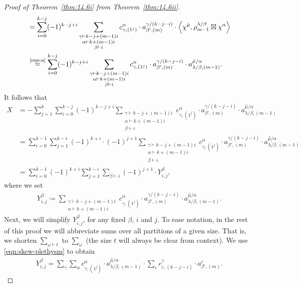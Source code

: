 \documentclass[ALCO, Unicode]{cedram}
\begin{document}
\begin{proof}[Proof of Theorem~\ref{thm:14.6i} from Theorem~\ref{thm:14.6ii}]
\begin{align*}
		&=\sum_{i=0}^{k-j}(-1)^{k-j+i}\sum_{\substack{\gamma\vdash k-j + (m-1)i\\ \alpha\vdash k+(m-1)i\\ \beta\vdash i}} c^{\alpha}_{\gamma,(1^j)}\cdot a^{\gamma/(k-j-i)}_{\beta',(m)}\cdot \left\langle\chi^{\hat{\mu}},\rho^{\lambda/\beta}_{m-1}\boxtimes\chi^\alpha\right\rangle\\
		&\overset{\normalfont\tiny\text{\eqref{eqn:a}}}{=}\sum_{i=0}^{k-j}(-1)^{k-j+i}\sum_{\substack{\gamma\vdash k-j + (m-1)i\\ \alpha\vdash k+(m-1)i\\ \beta\vdash i}} c^{\alpha}_{\gamma,(1^j)}\cdot a^{\gamma/(k-j-i)}_{\beta',(m)}\cdot a^{\hat{\mu}/\alpha}_{\lambda/\beta,(m-1)}.
	\end{align*}
	It follows that
	\begin{align*}
		X &= -\sum_{j=1}^k \sum_{i=0}^{k-j}(-1)^{k-j+i}\sum_{\substack{\gamma\vdash k-j + (m-1)i\\ \alpha\vdash k+(m-1)i\\ \beta\vdash i}} c^{\alpha}_{\gamma,(1^j)}\cdot a^{\gamma/(k-j-i)}_{\beta',(m)}\cdot a^{\hat{\mu}/\alpha}_{\lambda/\beta,(m-1)}\\
		&= \sum_{i=0}^{k-1} \sum_{j=1}^{k-i} (-1)^{k+i} \cdot (-1)^{j+1} \sum_{\substack{\gamma\vdash k-j + (m-1)i\\ \alpha\vdash k+(m-1)i\\ \beta\vdash i}} c^{\alpha}_{\gamma,(1^j)}\cdot a^{\gamma/(k-j-i)}_{\beta',(m)}\cdot a^{\hat{\mu}/\alpha}_{\lambda/\beta,(m-1)}\\
		&= \sum_{i=0}^{k-1} (-1)^{k+i} \sum_{j=1}^{k-i} \sum_{\beta\vdash i} (-1)^{j+1}\cdot Y^\beta_{i,j},
	\end{align*}
	where we set
	\begin{align*}
		Y^\beta_{i,j}\coloneqq \sum_{\substack{\gamma\vdash k-j + (m-1)i\\ \alpha\vdash k+(m-1)i}} c^{\alpha}_{\gamma,(1^j)}\cdot a^{\gamma/(k-j-i)}_{\beta',(m)}\cdot a^{\hat{\mu}/\alpha}_{\lambda/\beta,(m-1)}.
	\end{align*}
	Next, we will simplify $Y^\beta_{i,j}$, for any fixed $\beta$, $i$ and $j$. To ease notation, in the rest of this proof we will abbreviate sums over all partitions of a given size. That is, we shorten $\sum_{\omega\vdash t}$ to $\sum_\omega$ (the size $t$ will always be clear from context). We use \eqref{eqn:skew-plethysm} to obtain
	\begin{align*}
		Y^\beta_{i,j}=\sum_{\gamma} \sum_\alpha c^\alpha_{\gamma,(1^j)}\cdot a^{\hat{\mu}/\alpha}_{\lambda/\beta,(m-1)} \cdot \sum_\varepsilon c^\gamma_{\varepsilon,(k-j-i)}\cdot a^\varepsilon_{\beta',(m)}.

\end{align*}
\end{proof}
\end{document}
